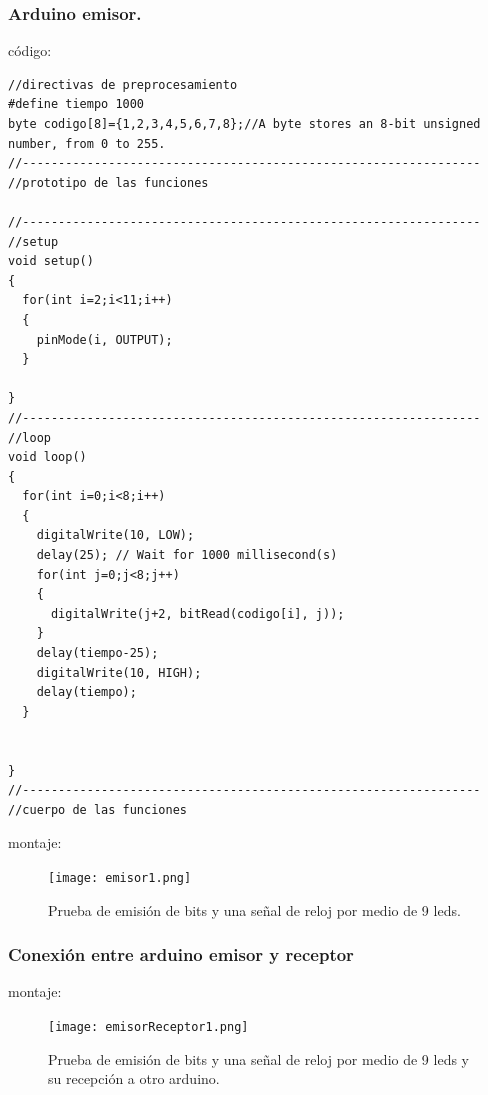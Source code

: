 \documentclass{article}
\begin{document}
\subsubsection{Arduino emisor.}\label{intento1}

código:
\begin{lstlisting}[style=myArduino]//directivas de preprocesamiento
#define tiempo 1000
byte codigo[8]={1,2,3,4,5,6,7,8};//A byte stores an 8-bit unsigned number, from 0 to 255.
//----------------------------------------------------------------
//prototipo de las funciones

//----------------------------------------------------------------
//setup
void setup()
{
  for(int i=2;i<11;i++)
  {
    pinMode(i, OUTPUT);
  }
  
}
//----------------------------------------------------------------
//loop
void loop()
{
  for(int i=0;i<8;i++)
  {
  	digitalWrite(10, LOW);
  	delay(25); // Wait for 1000 millisecond(s)
    for(int j=0;j<8;j++)
    {
      digitalWrite(j+2, bitRead(codigo[i], j));
    }
    delay(tiempo-25);
    digitalWrite(10, HIGH);
    delay(tiempo);
  }
  
  
}
//----------------------------------------------------------------
//cuerpo de las funciones
\end{lstlisting}

montaje:
\begin{figure}[h]
\texttt{[image: emisor1.png]}
\centering
\caption{Prueba de emisión de bits y una señal de reloj por medio de 9 leds.}
\label{fig:emisor1}
\end{figure}

\newpage
\subsubsection{Conexión entre arduino emisor y receptor}\label{intento1}

montaje:
\begin{figure}[h]
\texttt{[image: emisorReceptor1.png]}
\centering
\caption{Prueba de emisión de bits y una señal de reloj por medio de 9 leds y su recepción a otro arduino.}
\label{fig:emisorReceptor1}
\end{figure}
\end{document}

